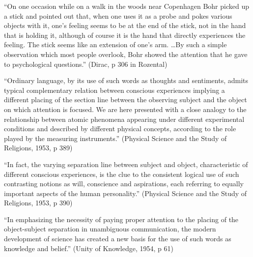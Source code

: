 \documentclass[ignorenonframetext, ]{beamer}
\begin{document}
\begin{frame}

  ``On one occasion while on a walk in the woods near Copenhagen Bohr
  picked up a stick and pointed out that, when one uses it as a probe
  and pokes various objects with it, one's feeling seems to be at the
  end of the stick, not in the hand that is holding it, although of
  course it is the hand that directly experiences the feeling. The
  stick seems like an extension of one's arm. \dots By such a simple
  observation which most people overlook, Bohr showed the attention
  that he gave to psychological questions.'' (Dirac, p 306 in
  Rozental)

\end{frame}

\begin{frame}

  ``Ordinary language, by its use of such words as thoughts and
  sentiments, admits typical complementary relation between conscious
  experiences implying a different placing of the section line between
  the observing subject and the object on which attention is focused.
  We are here presented with a close analogy to the relationship
  between atomic phenomena appearing under different experimental
  conditions and described by different physical concepts, according
  to the role played by the measuring instruments.'' \newline
  (Physical Science and the Study of Religions, 1953, p 389)

\end{frame}

\begin{frame}{}

  ``In fact, the varying separation line between subject and object,
  characteristic of different conscious experiences, is the clue to
  the consistent logical use of such contrasting notions as will,
  conscience and aspirations, each referring to equally important
  aspects of the human personality.'' \newline (Physical Science and
  the Study of Religions, 1953, p 390)

\end{frame}

\begin{frame}

  ``In emphasizing the necessity of paying proper attention to the
  placing of the object-subject separation in unambiguous
  communication, the modern development of science has created a new
  basis for the use of such words as knowledge and belief.'' (Unity of
  Knowledge, 1954, p 61)

\end{frame}
\end{document}
